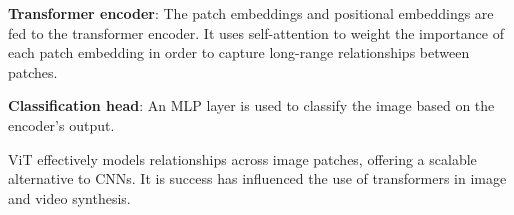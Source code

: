 \textbf{Transformer encoder}: The patch embeddings and positional embeddings are fed to the transformer encoder. It uses self-attention to weight the importance of each patch embedding in order to capture long-range relationships between patches.

\textbf{Classification head}: An MLP layer is used to classify the image based on the encoder's output.

ViT effectively models relationships across image patches, offering a scalable alternative to CNNs. It is success has influenced the use of transformers in image and video synthesis.